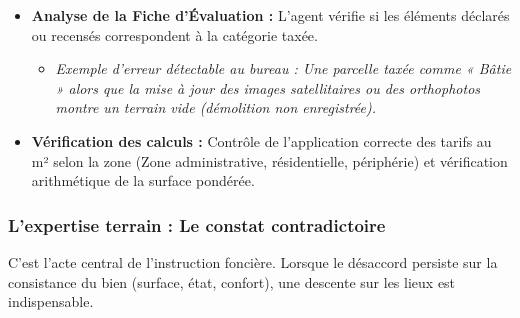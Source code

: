 \documentclass[Cours_contentieuxTF2026.tex]{subfiles}
\begin{document}
\begin{itemize}
	\item \textbf{Analyse de la Fiche d'Évaluation :} L'agent vérifie si les éléments déclarés ou recensés correspondent à la catégorie taxée.
	
	\begin{itemize}[label=\tiny$\blacksquare$]
	\item \textit{Exemple d'erreur détectable au bureau : Une parcelle taxée comme « Bâtie » alors que la mise à jour des images satellitaires ou des orthophotos montre un terrain vide (démolition non enregistrée).}
      \end{itemize}
      
	\item \textbf{Vérification des calculs :} Contrôle de l'application correcte des tarifs au m² selon la zone (Zone administrative, résidentielle, périphérie) et vérification arithmétique de la surface pondérée.
\end{itemize}

\subsubsection{L'expertise terrain : Le constat contradictoire}

C'est l'acte central de l'instruction foncière. Lorsque le désaccord persiste sur la consistance du bien (surface, état, confort), une descente sur les lieux est indispensable.
\end{document}
